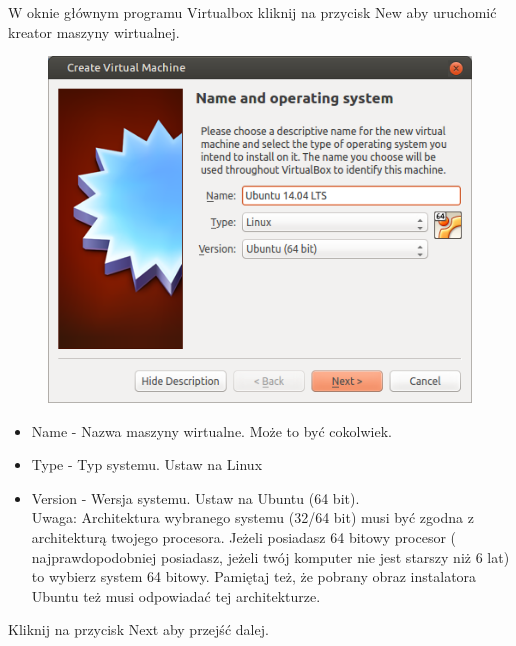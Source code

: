 W oknie głównym programu Virtualbox kliknij na przycisk \textcolor{ubuntu_orange}{New} aby uruchomić kreator maszyny wirtualnej.
\clearpage
\begin{figure}
                \includegraphics[width=\linewidth]{images/virtualbox_wizard1.png}
\end{figure}

\begin{itemize}
\item \textcolor{ubuntu_orange}{Name} - Nazwa maszyny wirtualne. Może to być cokolwiek.
\item \textcolor{ubuntu_orange}{Type} - Typ systemu. Ustaw na \textcolor{ubuntu_orange}{Linux}
\item \textcolor{ubuntu_orange}{Version} - Wersja systemu. Ustaw na \textcolor{ubuntu_orange}{Ubuntu (64 bit)}.\\
Uwaga: Architektura wybranego systemu (32/64 bit) musi być zgodna z architekturą twojego procesora. Jeżeli posiadasz 64 bitowy procesor ( najprawdopodobniej posiadasz, jeżeli twój komputer nie jest starszy niż 6 lat) to wybierz system 64 bitowy. Pamiętaj też, że pobrany obraz instalatora Ubuntu też musi odpowiadać tej architekturze.
\end{itemize}
\begin{flushright}
Kliknij na przycisk \textcolor{ubuntu_orange}{Next} aby przejść dalej.
\end{flushright}

